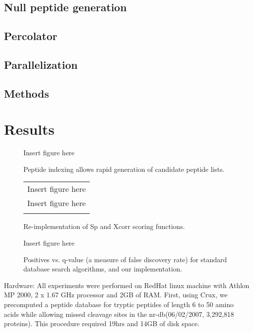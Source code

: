 \documentclass{bioinfo}
\begin{document}
\subsection{Null peptide generation}
\subsection{Percolator}
\subsection{Parallelization}

\begin{methods}
\section{Methods}

\end{methods}

\section{Results}

\begin{figure}
  \centering
  Insert figure here
  \caption{Peptide indexing allows rapid generation of candidate peptide
  lists.}
  \label{figure:indexing}
\end{figure}

\begin{figure}
  \centering
  \begin{tabular}{c}
  Insert figure here \\
  Insert figure here \\
  \caption{Re-implementation of Sp and Xcorr scoring functions.}
  \label{figure:indexing}
  \end{tabular}
\end{figure}

\begin{figure}
  \centering
  Insert figure here
  \caption{Positives vs. q-value (a measure of false discovery rate) for
  standard database search algorithms, and our implementation.}
  \label{figure:indexing}
\end{figure}

Hardware: All experiments were performed on RedHat linux machine with
Athlon MP 2000, 2 x 1.67 GHz processor and 2GB of RAM.  First, using
Crux, we precomputed a peptide database for tryptic peptides of length
6 to 50 amino acids while allowing missed cleavage sites in the
nr-db(06/02/2007, 3,292,818 proteins). This procedure required 19hrs
and 14GB of disk space.
\end{document}
